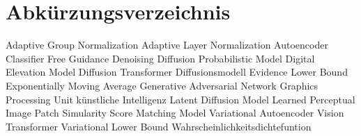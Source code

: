 \chapter*{Abkürzungsverzeichnis}

\begin{acronym}[AdaGN]
        {Adaptive Group Normalization}
        {Adaptive Layer Normalization}
           {Autoencoder}
          {Classifier Free Guidance}
         {Denoising Diffusion Probabilistic Model}
          {Digital Elevation Model}
          {Diffusion Transformer}
           {Diffusionsmodell}
         {Evidence Lower Bound}
          {Exponentially Moving Average}
          {Generative Adversarial Network}
          {Graphics Processing Unit}
           {künstliche Intelligenz}
          {Latent Diffusion Model}
        {Learned Perceptual Image Patch Simularity}
          {Score Matching Model}
          {Variational Autoencoder}
          {Vision Transformer}
          {Variational Lower Bound}
          {Wahrscheinlichkeitsdichtefuntion}
\end{acronym}